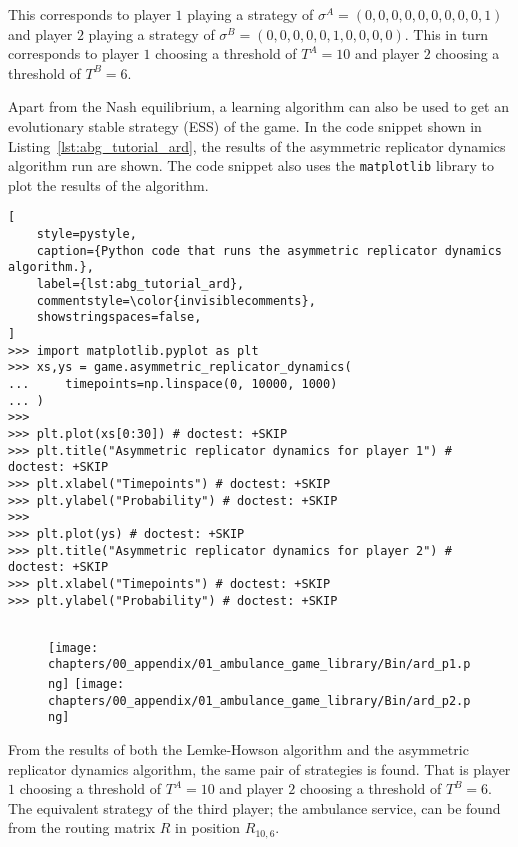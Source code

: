 This corresponds to player \(1\) playing a strategy of
\(\sigma^A = (0, 0, 0, 0, 0, 0, 0, 0, 0, 1)\) and player \(2\) playing a
strategy of \(\sigma^B = (0, 0, 0, 0, 0, 1, 0, 0, 0, 0)\).
This in turn corresponds to player \(1\) choosing a threshold of \(T^A = 10\)
and player \(2\) choosing a threshold of \(T^B = 6\).

Apart from the Nash equilibrium, a learning algorithm can also be used to get
an evolutionary stable strategy (ESS) of the game.
In the code snippet shown in Listing~\ref{lst:abg_tutorial_ard}, the results
of the asymmetric replicator dynamics algorithm run are shown.
The code snippet also uses the \texttt{matplotlib} library to plot the
results of the algorithm.


\begin{lstlisting}[
    style=pystyle,
    caption={Python code that runs the asymmetric replicator dynamics algorithm.},
    label={lst:abg_tutorial_ard},
    commentstyle=\color{invisiblecomments},
    showstringspaces=false,
]
>>> import matplotlib.pyplot as plt
>>> xs,ys = game.asymmetric_replicator_dynamics(
...     timepoints=np.linspace(0, 10000, 1000)
... )
>>>
>>> plt.plot(xs[0:30]) # doctest: +SKIP
>>> plt.title("Asymmetric replicator dynamics for player 1") # doctest: +SKIP
>>> plt.xlabel("Timepoints") # doctest: +SKIP
>>> plt.ylabel("Probability") # doctest: +SKIP
>>>
>>> plt.plot(ys) # doctest: +SKIP
>>> plt.title("Asymmetric replicator dynamics for player 2") # doctest: +SKIP
>>> plt.xlabel("Timepoints") # doctest: +SKIP
>>> plt.ylabel("Probability") # doctest: +SKIP
    
\end{lstlisting}

\begin{figure}[H]
    \centering
    \texttt{[image: chapters/00\_appendix/01\_ambulance\_game\_library/Bin/ard\_p1.png]}
    \texttt{[image: chapters/00\_appendix/01\_ambulance\_game\_library/Bin/ard\_p2.png]}
\end{figure}


From the results of both the Lemke-Howson algorithm and the asymmetric
replicator dynamics algorithm, the same pair of strategies is found.
That is player \(1\) choosing a threshold of \(T^A = 10\) and player \(2\)
choosing a threshold of \(T^B = 6\).
The equivalent strategy of the third player; the ambulance service, can be
found from the routing matrix \(R\) in position \(R_{10, 6}\).


